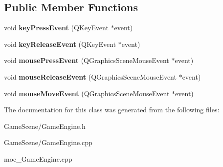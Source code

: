 \subsection*{Public Member Functions}
\begin{DoxyCompactItemize}
\item 
void {\bfseries key\+Press\+Event} (Q\+Key\+Event $\ast$event)\hypertarget{classGameEngine_aa73936c1c97161586f3293577e77f029}{}\label{classGameEngine_aa73936c1c97161586f3293577e77f029}

\item 
void {\bfseries key\+Release\+Event} (Q\+Key\+Event $\ast$event)\hypertarget{classGameEngine_a1cf0967d61ce05b59e0dcd3681cd3fdf}{}\label{classGameEngine_a1cf0967d61ce05b59e0dcd3681cd3fdf}

\item 
void {\bfseries mouse\+Press\+Event} (Q\+Graphics\+Scene\+Mouse\+Event $\ast$event)\hypertarget{classGameEngine_aea67b876a989ed7b7104bfac32fa17d4}{}\label{classGameEngine_aea67b876a989ed7b7104bfac32fa17d4}

\item 
void {\bfseries mouse\+Release\+Event} (Q\+Graphics\+Scene\+Mouse\+Event $\ast$event)\hypertarget{classGameEngine_afca8366e82ddb0299abc38caf8e627bf}{}\label{classGameEngine_afca8366e82ddb0299abc38caf8e627bf}

\item 
void {\bfseries mouse\+Move\+Event} (Q\+Graphics\+Scene\+Mouse\+Event $\ast$event)\hypertarget{classGameEngine_acb9e753f984d4f76d850a969844b499c}{}\label{classGameEngine_acb9e753f984d4f76d850a969844b499c}

\end{DoxyCompactItemize}


The documentation for this class was generated from the following files\+:\begin{DoxyCompactItemize}
\item 
Game\+Scene/Game\+Engine.\+h\item 
Game\+Scene/Game\+Engine.\+cpp\item 
moc\+\_\+\+Game\+Engine.\+cpp\end{DoxyCompactItemize}

